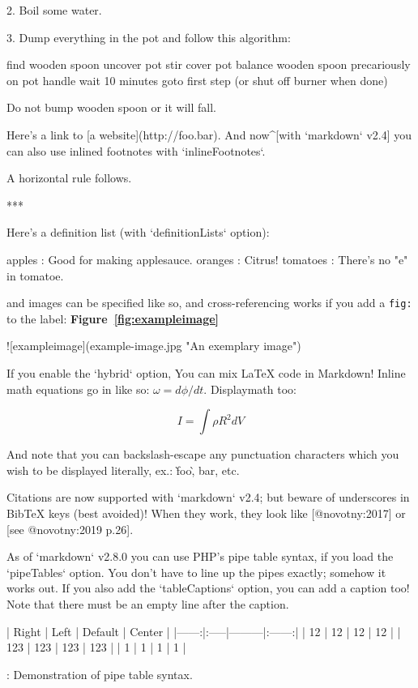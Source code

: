 \documentclass{article}
\begin{document}
\begin{markdown}
 2. Boil some water.

 3. Dump everything in the pot and follow
    this algorithm:

        find wooden spoon
        uncover pot
        stir
        cover pot
        balance wooden spoon precariously on pot handle
        wait 10 minutes
        goto first step (or shut off burner when done)

    Do not bump wooden spoon or it will fall.

Here's a link to [a website](http://foo.bar).  And now^[with `markdown` v2.4] you can also use inlined footnotes with `inlineFootnotes`.


A horizontal rule follows.

***

Here's a definition list (with `definitionLists` option):

apples
  : Good for making applesauce.
oranges
  : Citrus!
tomatoes
  : There's no "e" in tomatoe.

and images can be specified like so, and cross-referencing works if you add a \texttt{fig:} to the label: \textbf{Figure~\ref{fig:exampleimage}}



![exampleimage](example-image.jpg "An exemplary image")

If you enable the `hybrid` option, You can mix \LaTeX{} code in Markdown! Inline math equations go in like so: $\omega = d\phi / dt$. Displaymath too:

\begin{equation}
I = \int \rho R^{2} dV
\end{equation}

And note that you can backslash-escape any punctuation characters
which you wish to be displayed literally, ex.: \`foo\`, \*bar\*, etc.

Citations are now supported with `markdown` v2.4; but beware of underscores in BibTeX keys (best avoided)! 
When they work, they look like [@novotny:2017] or [see @novotny:2019 p.26]. 

As of `markdown` v2.8.0 you can use PHP's pipe table syntax, if you load the `pipeTables` option. You don't have to line up the pipes exactly; somehow it works out. If you also add the `tableCaptions` option, you can add a caption too! Note that there must be an empty line after the caption.


| Right | Left | Default | Center |
|------:|:-----|---------|:------:| 
|  12   |  12  |  12     |   12   | 
| 123   |  123 |   123   |  123   | 
|   1   |    1 |     1   |    1   | 

  : Demonstration of pipe table syntax.

\end{markdown}



\end{document}
